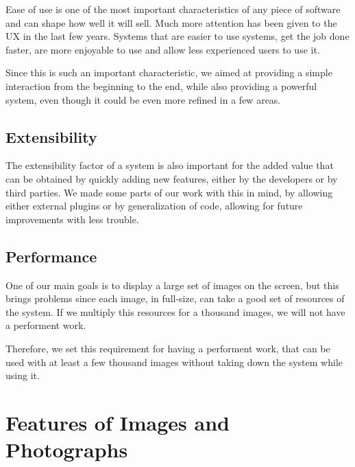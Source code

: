 Ease of use is one of the most important characteristics of any piece of software and can shape how well it will sell. Much more attention has been given to the \ac{UX} in the last few years. Systems that are easier to use systems, get the job done faster, are more enjoyable to use and allow less experienced users to use it.

Since this is such an important characteristic, we aimed at providing a simple interaction from the beginning to the end, while also providing a powerful system, even though it could be even more refined in a few areas.




\subsection{Extensibility} %
\label{reqs:Extensibility}

The extensibility factor of a system is also important for the added value that can be obtained by quickly adding new features, either by the developers or by third parties. We made some parts of our work with this in mind, by allowing either external plugins or by generalization of code, allowing for future improvements with less trouble.




\subsection{Performance} %
\label{reqs:Performance}

One of our main goals is to display a large set of images on the screen, but this brings problems since each image, in full-size, can take a good set of resources of the system. If we multiply this resources for a thousand images, we will not have a performent work.

Therefore, we set this requirement for having a performent work, that can be used with at least a few thousand images without taking down the system while using it.








\section{Features of Images and Photographs}
\label{reqs:features}

